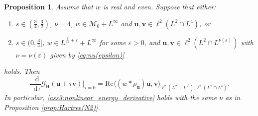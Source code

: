 \documentclass[12pt,a4paper]{amsart}
\newtheorem{prop}[theorem]{Proposition}
\numberwithin{equation}{section}
\newcommand{\ulu}{\boldsymbol{u}}
\newcommand{\ulv}{\boldsymbol{v}}
\newcommand*\diff{\mathop{}\!\mathrm{d}}
\begin{document}
	\begin{prop}
		Assume that $w$ is real and even. Suppose that either:
		\begin{enumerate}[label=\roman*)]
			\item $s\in(\frac34,\frac32)$, $\nu=4$, $w\in\mathcal{M}_0+L^\infty$ and $\ulu,\ulv\in \ell^2(L^2\cap L^{4})$, or
			\item $s\in(0,\frac34]$, $w\in L^{\frac{3}{4s}+\varepsilon}+L^\infty$ for some $\varepsilon>0$, and $\ulu,\ulv\in \ell^2(L^2\cap L^{\nu(\varepsilon)})$ with $\nu=\nu(\varepsilon)$ given by \eqref{eq:nu(epsilon)}
		\end{enumerate}
		holds. Then
		\begin{equation}\label{eq:diffHartree}
			\frac{\diff}{\diff \tau} \mathscr{G}_{\mathrm{H}}(\ulu + \tau \ulv) \Big|_{\tau=0} = \mathrm{Re} \langle (w \ast \rho_{\ulu} ) \ulu, \ulv \rangle_{\ell^2(L^2+L^{\nu^\prime}),\ell^2(L^2\cap L^\nu)} .
		\end{equation}
		In particular, \ref{ass3:nonlinear_energy_derivative} holds with the same $\nu$ as in Proposition \ref{prop:Hartree(N2)}.
	\end{prop}
\end{document}
